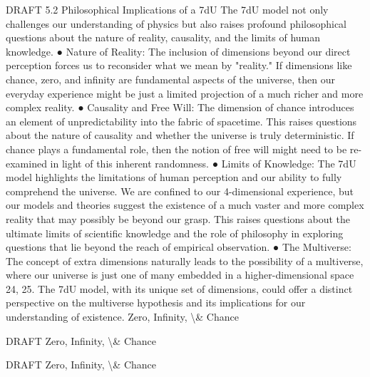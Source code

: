 \documentclass[12pt]{article}
\begin{document}
DRAFT
5.2 Philosophical Implications of a 7dU
The 7dU model not only challenges our understanding of physics but also raises profound
philosophical questions about the nature of reality, causality, and the limits of human
knowledge.
●
Nature of Reality: The inclusion of dimensions beyond our direct perception forces
us to reconsider what we mean by "reality." If dimensions like chance, zero, and
inﬁnity are fundamental aspects of the universe, then our everyday experience
might be just a limited projection of a much richer and more complex reality.
●
Causality and Free Will: The dimension of chance introduces an element of
unpredictability into the fabric of spacetime. This raises questions about the nature
of causality and whether the universe is truly deterministic. If chance plays a
fundamental role, then the notion of free will might need to be re-examined in light
of this inherent randomness.
●
Limits of Knowledge: The 7dU model highlights the limitations of human perception
and our ability to fully comprehend the universe. We are conﬁned to our
4-dimensional experience, but our models and theories suggest the existence of a
much vaster and more complex reality that may possibly be beyond our grasp. This
raises questions about the ultimate limits of scientiﬁc knowledge and the role of
philosophy in exploring questions that lie beyond the reach of empirical
observation.
●
The Multiverse: The concept of extra dimensions naturally leads to the possibility of
a multiverse, where our universe is just one of many embedded in a
higher-dimensional space 24, 25. The 7dU model, with its unique set of dimensions,
could oﬀer a distinct perspective on the multiverse hypothesis and its implications
for our understanding of existence.
Zero, Infinity, \textbackslash{}& Chance

DRAFT
Zero, Infinity, \textbackslash{}& Chance

DRAFT
Zero, Infinity, \textbackslash{}& Chance
\end{document}
